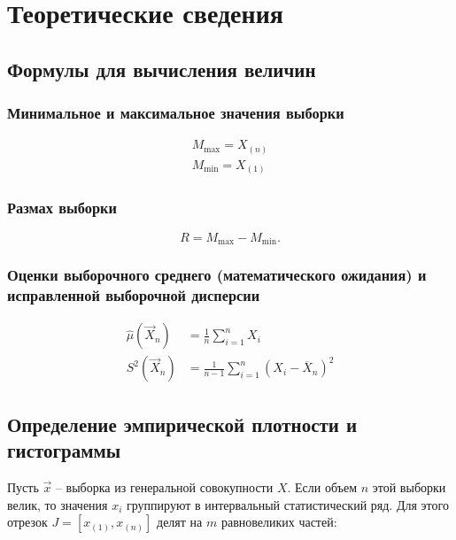 \documentclass[12pt]{report}
\begin{document}
\chapter*{Теоретические сведения}

\section*{Формулы для вычисления величин}

\subsection*{Минимальное и максимальное значения выборки}
\begin{equation}
	\begin{aligned}
		M_{\max} = X_{(n)}\\
		M_{\min} = X_{(1)}
	\end{aligned}
\end{equation}

\subsection*{Размах выборки}
\begin{equation}
	R = M_{\max} - M_{\min}.
\end{equation}

\subsection*{Оценки выборочного среднего (математического ожидания) и исправленной выборочной дисперсии}
\begin{equation}
	\begin{aligned}
		\hat\mu(\vec X_n) &= \frac 1n \sum_{i=1}^n X_i\\
		S^2(\vec X_n) &= \frac 1{n-1} \sum_{i=1}^n (X_i-\overline X_n)^2
	\end{aligned}
\end{equation}

\section*{Определение эмпирической плотности и гистограммы}

Пусть $\vec x$ -- выборка из генеральной совокупности $X$. Если объем $n$ этой выборки велик, то значения $x_i$ группируют в интервальный статистический ряд. Для этого отрезок $J = [x_{(1)}, x_{(n)}]$ делят на $m$ равновеликих частей:
\end{document}
